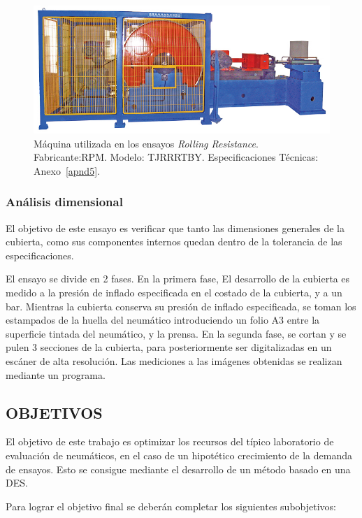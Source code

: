 \begin{figure}[H]
	\begin{center}
		\includegraphics[width=\textwidth]{fig/2_rr_machine}
	\end{center}
	\caption{Máquina utilizada en los ensayos \textit{Rolling Resistance}. Fabricante:RPM. Modelo: TJRRRTBY. Especificaciones Técnicas: Anexo~\ref{apnd5}.}
	\label{fig:2_rr_machine}
\end{figure}

\subsubsection{Análisis dimensional}
El objetivo de este ensayo es verificar que
tanto las dimensiones generales de la cubierta,
como sus componentes internos
quedan dentro de la tolerancia de las especificaciones.

El ensayo se divide en 2 fases.
En la primera fase, El desarrollo de la cubierta es medido a la presión de
inflado especificada en el costado de la cubierta, y a un bar.
Mientras la cubierta conserva su presión de inflado especificada,
se toman los estampados de la huella del neumático introduciendo un folio A3 entre la superficie tintada del neumático, y la prensa.
En la segunda fase, se cortan y se pulen 3 secciones de la cubierta,
para posteriormente ser digitalizadas en un escáner de alta resolución.
Las mediciones a las imágenes obtenidas se realizan mediante un programa.

\subsection{OBJETIVOS}\label{sec_obj}
El objetivo de este trabajo es optimizar los recursos del
típico laboratorio de evaluación de neumáticos,
en el caso de un hipotético crecimiento de la demanda de ensayos.
Esto se consigue mediante el desarrollo de un método basado en una DES.

Para lograr el objetivo final se deberán completar los siguientes subobjetivos:

